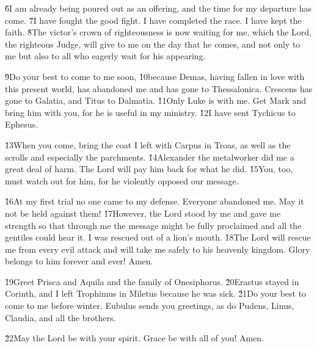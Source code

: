 \v{6}I am already being poured out as an offering, and the time for my departure has come. \v{7}I have fought the good fight. I have completed the race. I have kept the faith. \v{8}The victor's crown of righteousness is now waiting for me, which the Lord, the righteous Judge, will give to me on the day that he comes, and not only to me but also to all who eagerly wait for his appearing.

\v{9}Do your best to come to me soon, \v{10}because Demas, having fallen in love with this present world, has abandoned me and has gone to Thessalonica. Crescens has gone to Galatia, and Titus to Dalmatia. \v{11}Only Luke is with me. Get Mark and bring him with you, for he is useful in my ministry. \v{12}I have sent Tychicus to Ephesus.

\v{13}When you come, bring the coat I left with Carpus in Troas, as well as the scrolls and especially the parchments. \v{14}Alexander the metalworker did me a great deal of harm. The Lord will pay him back for what he did. \v{15}You, too, must watch out for him, for he violently opposed our message.

\v{16}At my first trial no one came to my defense. Everyone abandoned me. May it not be held against them! \v{17}However, the Lord stood by me and gave me strength so that through me the message might be fully proclaimed and all the gentiles could hear it. I was rescued out of a lion's mouth. \v{18}The Lord will rescue me from every evil attack and will take me safely to his heavenly kingdom. Glory belongs to him forever and ever! Amen.

\v{19}Greet Prisca and Aquila and the family of Onesiphorus. \v{20}Erastus stayed in Corinth, and I left Trophimus in Miletus because he was sick. \v{21}Do your best to come to me before winter. Eubulus sends you greetings, as do Pudens, Linus, Claudia, and all the brothers.

\v{22}May the Lord be with your spirit. Grace be with all of you! Amen.
